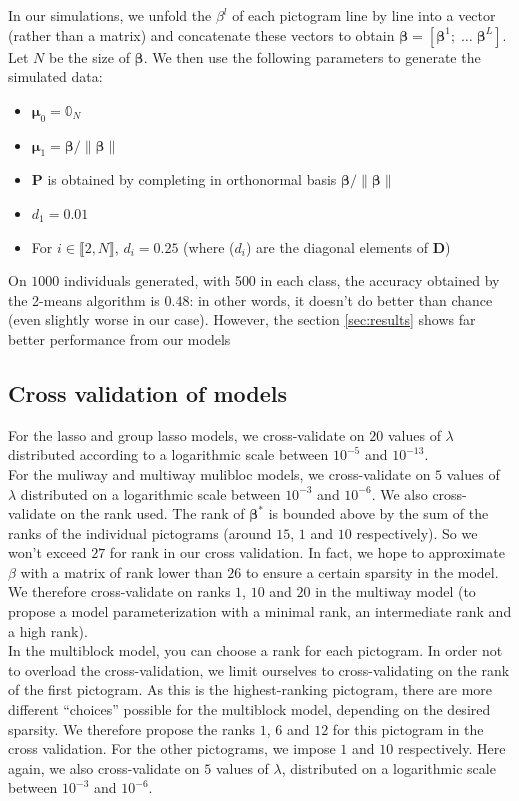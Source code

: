 \documentclass[preprint,12pt]{elsarticle}
\begin{document}
\noindent In our simulations, we unfold the $\beta^l$ of each pictogram line by line into a vector (rather than a matrix) and concatenate these vectors to obtain $\bm{\beta} = [\bm{\beta}^1; \; \hdots \; \bm{\beta}^L]$. Let $N$ be the size of $\bm{\beta}$. We then use the following parameters to generate the simulated data:
\begin{itemize}[label = $\bullet$]
    \item $\bm{\mu}_0 = \mathbb{0}_N$
    \item $\bm{\mu}_1 = \bm{\beta}/\lVert \bm{\beta}\rVert$ 
    \item $\mathbf{P}$ is obtained by completing in orthonormal basis $\bm{\beta}/\lVert \bm{\beta}\rVert$
    \item $d_1 = 0.01$
    \item For $i \in \llbracket 2, N \rrbracket$, $d_i = 0.25$ (where ($d_i$) are the diagonal elements of $\mathbf{D}$) 
\end{itemize}

On $1000$ individuals generated, with 500 in each class, the accuracy obtained by the 2-means algorithm is $0.48$: in other words, it doesn't do better than chance (even slightly worse in our case). However, the section \ref{sec:results} shows far better performance from our models

\subsection{Cross validation of models}

\noindent For the lasso and group lasso models, we cross-validate on $20$ values of $\lambda$ distributed according to a logarithmic scale between $10^{-5}$ and $10^{-13}$.\\
\indent For the muliway and multiway mulibloc models, we cross-validate on $5$ values of $\lambda$ distributed on a logarithmic scale between $10^{-3}$ and $10^{-6}$. We also cross-validate on the rank used. The rank of $\bm{\beta}^*$ is bounded above by the sum of the ranks of the individual pictograms (around $15$, $1$ and $10$ respectively). So we won't exceed $27$ for rank in our cross validation. In fact, we hope to approximate $\beta$ with a matrix of rank lower than $26$ to ensure a certain sparsity in the model. We therefore cross-validate on ranks $1$, $10$ and $20$ in the multiway model (to propose a model parameterization with a minimal rank, an intermediate rank and a high rank).\\
\indent In the multiblock model, you can choose a rank for each pictogram. In order not to overload the cross-validation, we limit ourselves to cross-validating on the rank of the first pictogram. As this is the highest-ranking pictogram, there are more different “choices” possible for the multiblock model, depending on the desired sparsity. We therefore propose the ranks $1$, $6$ and $12$ for this pictogram in the cross validation. For the other pictograms, we impose $1$ and $10$ respectively. Here again, we also cross-validate on $5$ values of $\lambda$, distributed on a logarithmic scale between $10^{-3}$ and $10^{-6}$.
\end{document}
